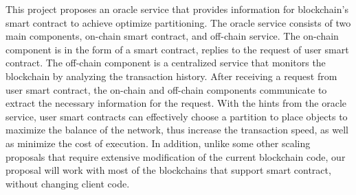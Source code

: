 This project proposes an oracle service that provides information for
blockchain's smart contract to achieve optimize partitioning. The oracle service
consists of two main components, on-chain smart contract, and off-chain service.
The on-chain component is in the form of a smart contract, replies to the request of
user smart contract. The off-chain component is a centralized  service that monitors the blockchain by analyzing the transaction
history. After receiving a request from user smart contract, the on-chain and
off-chain components communicate to extract the necessary information for the
request. With the hints from the oracle service, user smart contracts can
effectively choose a partition to place objects to maximize the balance of the
network, thus increase the transaction speed, as well as minimize the cost of
execution. In addition, unlike some other scaling proposals that require
extensive modification of the current blockchain code, our proposal will work
with most of the blockchains that support smart contract, without changing client
code.
